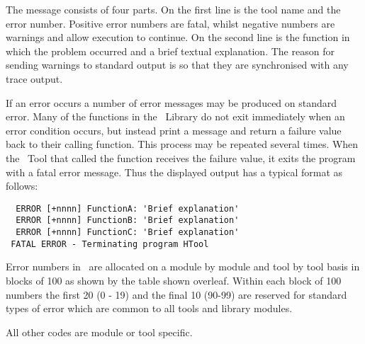 The message consists of four parts.  On the first line is the tool
name and the error number.  Positive
error numbers are fatal, whilst negative numbers are warnings and
allow execution to continue.  On the second line is the function in
which the problem occurred and a brief textual explanation.  The
reason for sending warnings to standard output is so that they are
synchronised with any trace output.

If an error occurs a number of error messages may be produced on
standard error. Many of the functions in the \HTK\ Library do not exit
immediately when an error condition occurs, but instead print a message and return a failure
value back to their calling function. This process may be repeated several
times. When the \HTK\ Tool that called the function receives the failure
value, it exits the program with a fatal error message. Thus the
displayed output has a typical format as follows:

\begin{verbatim}
  ERROR [+nnnn] FunctionA: 'Brief explanation'
  ERROR [+nnnn] FunctionB: 'Brief explanation'
  ERROR [+nnnn] FunctionC: 'Brief explanation'
 FATAL ERROR - Terminating program HTool
\end{verbatim}

Error numbers in \HTK\ are allocated on a module by module
and tool by tool basis in blocks of 100 as shown by the table shown
overleaf.
Within each block of 100 numbers the first 20 (0 - 19)
and the final 10 (90-99) are reserved for standard types 
of error which are common to all tools and library 
modules.

All other codes are module or tool specific.


